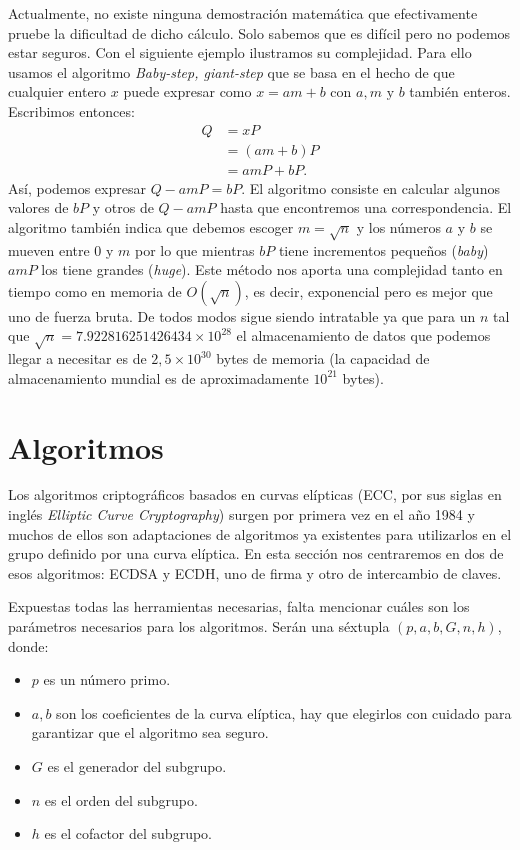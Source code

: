 \documentclass[11pt]{article}
\begin{document}
Actualmente, no existe ninguna demostración matemática que efectivamente pruebe la dificultad de dicho cálculo. Solo sabemos que es difícil pero no podemos estar seguros. Con el siguiente ejemplo ilustramos su complejidad. Para ello usamos el algoritmo \textit{Baby-step, giant-step} que se basa en el hecho de que cualquier entero $ x $ puede expresar como $ x = am+b $ con $ a,m \text{ y } b$ también enteros. Escribimos entonces:
\begin{equation*}
\begin{split}
Q &= xP \\
  &= (am+b)P\\
  &=amP + bP.
\end{split}
\end{equation*}
Así, podemos expresar $ Q - amP  = bP $. El algoritmo consiste en calcular algunos valores de $ bP $ y otros de $ Q-amP $ hasta que encontremos una correspondencia. El algoritmo también indica que debemos escoger $ m = \sqrt{n} $ y los números $ a $ y $ b $ se mueven entre 0 y $ m $ por lo que mientras $ bP $ tiene incrementos pequeños (\textit{baby}) $ amP $ los tiene grandes (\textit{huge}). Este método nos aporta una complejidad tanto en tiempo como en memoria de $ O(\sqrt{n}) $, es decir, exponencial pero es mejor que uno de fuerza bruta. De todos modos sigue siendo intratable ya que para un $  n  $ tal que $ \sqrt{n} = 7.922816251426434 \times 10^{28} $ el almacenamiento de datos que podemos llegar a necesitar es de $ 2,5\times10^{30} $ bytes de memoria (la capacidad de almacenamiento mundial es de aproximadamente $ 10^{21} $ bytes). \\

\section{Algoritmos}
\label{sec:alg}
Los algoritmos criptográficos basados en curvas elípticas (ECC, por sus siglas en inglés \textit{Elliptic Curve Cryptography}) surgen por primera vez en el año 1984 y muchos de ellos son adaptaciones de algoritmos ya existentes para utilizarlos en el grupo definido por una curva elíptica. En esta sección nos centraremos en dos de esos algoritmos: ECDSA y ECDH, uno de firma y otro de intercambio de claves.

Expuestas todas las herramientas necesarias, falta mencionar cuáles son los parámetros necesarios para los algoritmos. Serán una séxtupla $ (p, a, b, G, n, h) $, donde:
\begin{itemize}
	\item $ p $ es un número primo.
	\item $ a, b $ son los coeficientes de la curva elíptica, hay que elegirlos con cuidado para garantizar que el algoritmo sea seguro.
	\item $ G $ es el generador del subgrupo.
	\item $ n $ es el orden del subgrupo.
	\item $ h $ es el cofactor del subgrupo.
\end{itemize}
\end{document}
